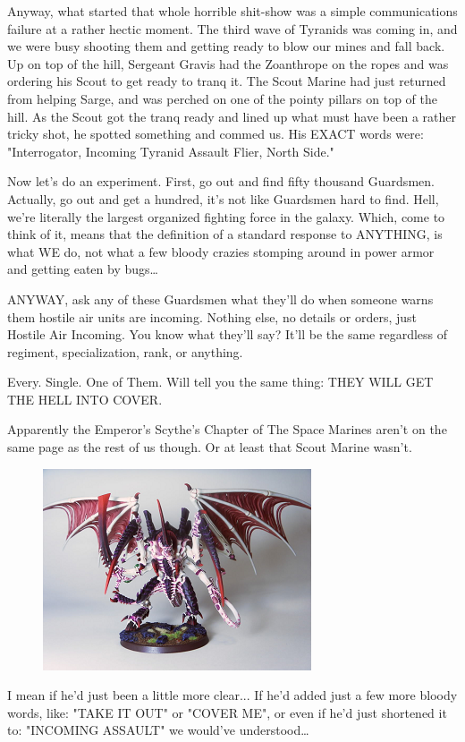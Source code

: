 Anyway, what started that whole horrible shit-show was a simple communications failure at a rather hectic moment. 
The third wave of Tyranids was coming in, and we were busy shooting them and getting ready to blow our mines and fall back. 
Up on top of the hill, Sergeant Gravis had the Zoanthrope on the ropes and was ordering his Scout to get ready to tranq it. 
The Scout Marine had just returned from helping Sarge, and was perched on one of the pointy pillars on top of the hill. 
As the Scout got the tranq ready and lined up what must have been a rather tricky shot, he spotted something and commed us. 
His EXACT words were: 
"Interrogator, Incoming Tyranid Assault Flier, North Side."

Now let's do an experiment. 
First, go out and find fifty thousand Guardsmen. 
Actually, go out and get a hundred, it's not like Guardsmen hard to find. 
Hell, we're literally the largest organized fighting force in the galaxy. 
Which, come to think of it, means that the definition of a standard response to ANYTHING, is what WE do, not what a few bloody crazies stomping around in power armor and getting eaten by bugs…

ANYWAY, ask any of these Guardsmen what they'll do when someone warns them hostile air units are incoming. 
Nothing else, no details or orders, just Hostile Air Incoming. 
You know what they'll say? 
It'll be the same regardless of regiment, specialization, rank, or anything. 


Every. 
Single. 
One of Them. 
Will tell you the same thing: 
THEY WILL GET THE HELL INTO COVER.

Apparently the Emperor's Scythe's Chapter of The Space Marines aren't on the same page as the rest of us though. 
Or at least that Scout Marine wasn't.

\begin{figure}
	\begin{center}
		\includegraphics[width=\figwidth]{pics/12/46.png}
	\end{center}
\end{figure}
I mean if he'd just been a little more clear... 
If he'd added just a few more bloody words, like: 
"TAKE IT OUT" or "COVER ME", or even if he'd just shortened it to: 
"INCOMING ASSAULT" we would've understood… 

